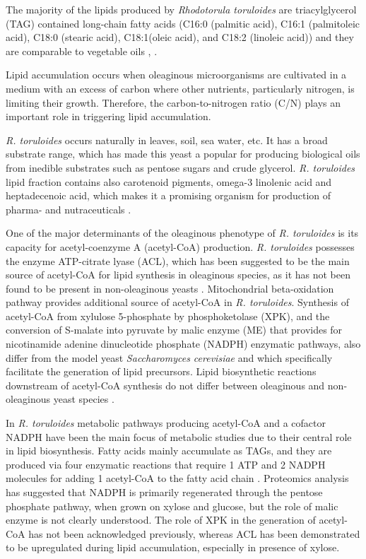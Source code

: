 The majority of the lipids produced by \textit{Rhodotorula toruloides} are
triacylglycerol (TAG) contained long-chain fatty acids (C16:0 
(palmitic acid), C16:1 (palmitoleic acid), C18:0 (stearic acid), C18:1(oleic acid), and C18:2 (linoleic acid)) and they
are comparable to vegetable oils \cite{Li2007}, \cite{Vasconcelos2019}.

Lipid accumulation occurs when oleaginous microorganisms are cultivated in a medium with an excess of 
carbon where other nutrients, particularly nitrogen, is limiting their growth. 
Therefore, the carbon-to-nitrogen ratio (C/N) plays an important role in triggering
lipid accumulation. \cite{Lopes2020}

\textit{R. toruloides} occurs naturally in leaves, soil, sea water, etc. It has a broad substrate range, 
which has made this yeast a popular for producing biological oils from inedible 
substrates such as pentose sugars and crude glycerol. \cite{Tiukova2019} 
\textit{R. toruloides} lipid fraction contains also carotenoid pigments, 
omega-3 linolenic acid and heptadecenoic acid,
which makes it a promising organism for production of pharma- and nutraceuticals \cite{Buzzini2007}. 

One of the major determinants of the oleaginous phenotype of \textit{R. toruloides} is its capacity for acetyl-coenzyme A (acetyl-CoA) production. 
\textit{R. toruloides} possesses the enzyme ATP-citrate lyase (ACL), 
which has been suggested to be the main source of acetyl-CoA for lipid
synthesis in oleaginous species, as it has not been found to be present in non-oleaginous yeasts \cite{Vorapreeda2012}. Mitochondrial beta-oxidation pathway
provides additional source of acetyl-CoA in \textit{R. toruloides}. \cite{Tiukova2019}
Synthesis of acetyl-CoA from xylulose 5-phosphate by phosphoketolase (XPK), and the conversion of S-malate into pyruvate by 
malic enzyme (ME) that provides for nicotinamide adenine dinucleotide phosphate (NADPH) enzymatic pathways, also differ from the model yeast \textit{Saccharomyces
cerevisiae} and which specifically facilitate the generation of lipid precursors.\cite{Rekena2023}
Lipid biosynthetic reactions downstream of acetyl-CoA synthesis do not differ between oleaginous and non-oleaginous 
yeast species \cite{Tiukova2019}.

In \textit{R. toruloides} metabolic pathways producing acetyl-CoA and a cofactor NADPH
have been the main focus of metabolic studies due to their central role in lipid
biosynthesis. Fatty acids mainly accumulate as TAGs, and they are
produced via four enzymatic reactions that require 1 ATP and 2 NADPH molecules for adding 1 acetyl-CoA to the fatty acid chain \cite{Lian2015}.
Proteomics analysis has suggested that NADPH is primarily regenerated through the pentose phosphate pathway, when grown on xylose 
and glucose, but the role of malic enzyme is not clearly understood. The
role of XPK in the generation of acetyl-CoA has not been acknowledged previously, whereas
ACL has been demonstrated to be upregulated during lipid accumulation, especially in
presence of xylose.\cite{Rekena2023} 



